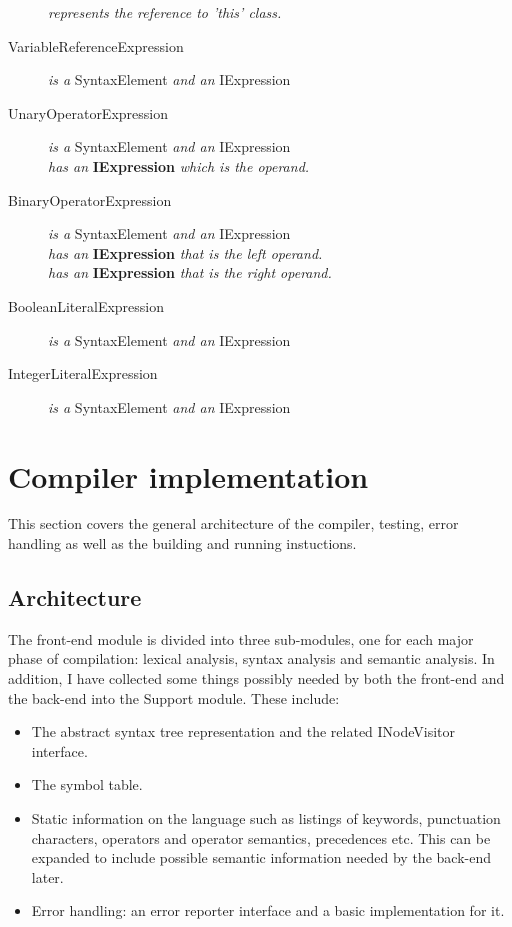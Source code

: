 \documentclass[a4paper,11pt]{article}
\begin{document}
\begin{description}
\emph{represents the reference to 'this' class.}
\item[VariableReferenceExpression] \emph{is a} SyntaxElement \emph{and an} IExpression
\item[UnaryOperatorExpression] \emph{is a} SyntaxElement \emph{and an} IExpression \\
\emph{has an} \textbf{IExpression} \emph{which is the operand.}
\item[BinaryOperatorExpression] \emph{is a} SyntaxElement \emph{and an} IExpression \\
\emph{has an} \textbf{IExpression} \emph{that is the left operand.} \\
\emph{has an} \textbf{IExpression} \emph{that is the right operand.}
\item[BooleanLiteralExpression] \emph{is a} SyntaxElement \emph{and an} IExpression
\item[IntegerLiteralExpression] \emph{is a} SyntaxElement \emph{and an} IExpression
\end{description}

\section{Compiler implementation}

This section covers the general architecture of the compiler, testing, error handling as well as the building and running instuctions.

\subsection{Architecture}

The front-end module is divided into three sub-modules, one for each major phase of compilation: lexical analysis, syntax analysis and semantic analysis. In addition, I have collected some things possibly needed by both the front-end and the back-end into the Support module. These include:
\begin{itemize}
\item The abstract syntax tree representation and the related INodeVisitor interface.
\item The symbol table.
\item Static information on the language such as listings of keywords, punctuation characters, operators and operator semantics, precedences etc. This can be expanded to include possible semantic information needed by the back-end later.
\item Error handling: an error reporter interface and a basic implementation for it.
\end{itemize}
\end{document}
